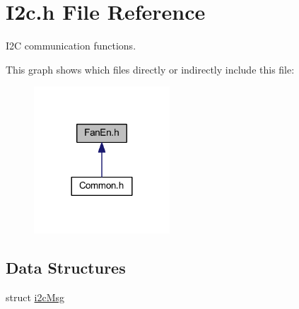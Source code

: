 \hypertarget{a00018}{\section{I2c.\-h File Reference}
\label{a00018}
}


I2\-C communication functions.  


This graph shows which files directly or indirectly include this file\-:
\nopagebreak
\begin{figure}[H]
\begin{center}
\leavevmode
\includegraphics[width=144pt]{a00048}
\end{center}
\end{figure}
\subsection*{Data Structures}
\begin{DoxyCompactItemize}
\item 
struct \hyperlink{a00004}{i2c\-Msg}
\end{DoxyCompactItemize}
